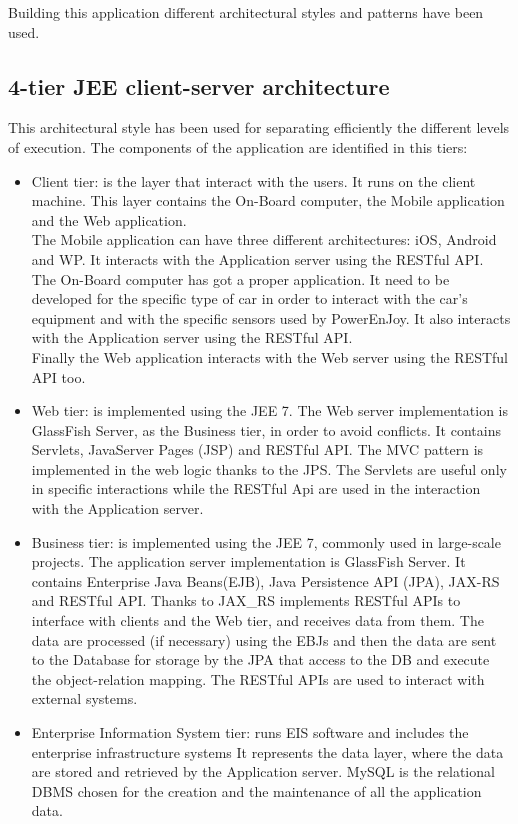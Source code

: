 Building this application different architectural styles and patterns have been used.
\subsection{4-tier JEE client-server architecture}
	This architectural style has been used for separating efficiently the different levels of execution. The components of the application are identified in this tiers:
	\begin{itemize}
		\item{Client tier: is the layer that interact with the users. It runs on the client machine. This layer contains the On-Board computer, the Mobile application and the Web application. 
		\\The Mobile application can have three different architectures: iOS, Android and WP. It interacts with the Application server using the RESTful API.
		\\The On-Board computer has got a proper application. It need to be developed for the specific type of car in order to interact with the car's equipment and with the specific sensors used by PowerEnJoy. It also interacts with the Application server using the RESTful API.
		\\Finally the Web application interacts with the Web server using the RESTful API too.}
		\item{Web tier: is implemented using the JEE 7. The Web server implementation is GlassFish Server, as the Business tier, in order to avoid conflicts. It contains Servlets, JavaServer Pages (JSP) and RESTful API. The MVC pattern is implemented in the web logic thanks to the JPS. The Servlets are useful only in specific interactions while the RESTful Api are used in the interaction with the Application server.}
		\item{Business tier: is implemented using the JEE 7, commonly used in large-scale projects. The application server implementation is  GlassFish Server. It contains Enterprise Java Beans(EJB), Java Persistence API (JPA), JAX-RS and RESTful API. Thanks to JAX_RS implements RESTful APIs to interface with clients and the Web tier, and receives data from them. The data are processed (if necessary) using the EBJs and then the data are sent to the Database for storage by the JPA that access to the DB and execute the object-relation mapping. The RESTful APIs are used to interact with external systems.}
		\item{Enterprise Information System tier: runs EIS software and includes the enterprise infrastructure systems It represents the data layer, where the data are stored and retrieved by the Application server. MySQL is the relational DBMS chosen for the creation and the maintenance of all the application data.}
	\end{itemize}
